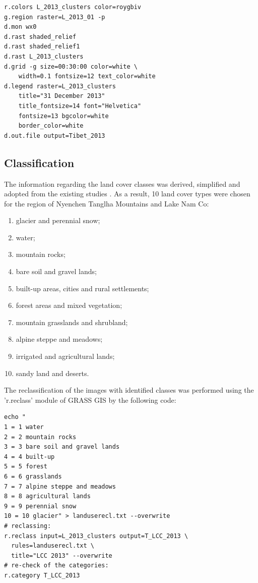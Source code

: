 \documentclass[final,5p,times,twocolumn]{elsarticle}
\begin{document}
\begin{verbatim}
r.colors L_2013_clusters color=roygbiv
g.region raster=L_2013_01 -p
d.mon wx0
d.rast shaded_relief
d.rast shaded_relief1
d.rast L_2013_clusters
d.grid -g size=00:30:00 color=white \
	width=0.1 fontsize=12 text_color=white
d.legend raster=L_2013_clusters 
	title="31 December 2013" 
	title_fontsize=14 font="Helvetica" 
	fontsize=13 bgcolor=white 
	border_color=white
d.out.file output=Tibet_2013
 \end{verbatim}

\subsection{Classification}

The information regarding the land cover classes was derived, simplified and adopted from the existing studies \cite{Chuetal2010,agriculture13020312,Zhangetal2016ecs21591}. As a result, 10 land cover types were chosen for the region of Nyenchen Tanglha Mountains and Lake Nam Co: 

\begin{enumerate}
	\item glacier and perennial snow; 
	\item water; 
	\item mountain rocks; 
	\item bare soil and gravel lands; 
	\item built-up areas, cities and rural settlements; 
	\item forest areas and mixed vegetation; 
	\item mountain grasslands and shrubland; 
	\item alpine steppe and meadows; 
	\item irrigated and agricultural lands;
	\item sandy land and deserts. 
\end{enumerate}

The reclassification of the images with identified classes was performed using the 'r.reclass' module of GRASS GIS by the following code: 

\begin{verbatim}
echo "
1 = 1 water
2 = 2 mountain rocks
3 = 3 bare soil and gravel lands
4 = 4 built-up
5 = 5 forest
6 = 6 grasslands
7 = 7 alpine steppe and meadows
8 = 8 agricultural lands
9 = 9 perennial snow
10 = 10 glacier" > landuserecl.txt --overwrite
# reclassing:
r.reclass input=L_2013_clusters output=T_LCC_2013 \
  rules=landuserecl.txt \
  title="LCC 2013" --overwrite
# re-check of the categories: 
r.category T_LCC_2013
\end{verbatim}
	
\end{document}

